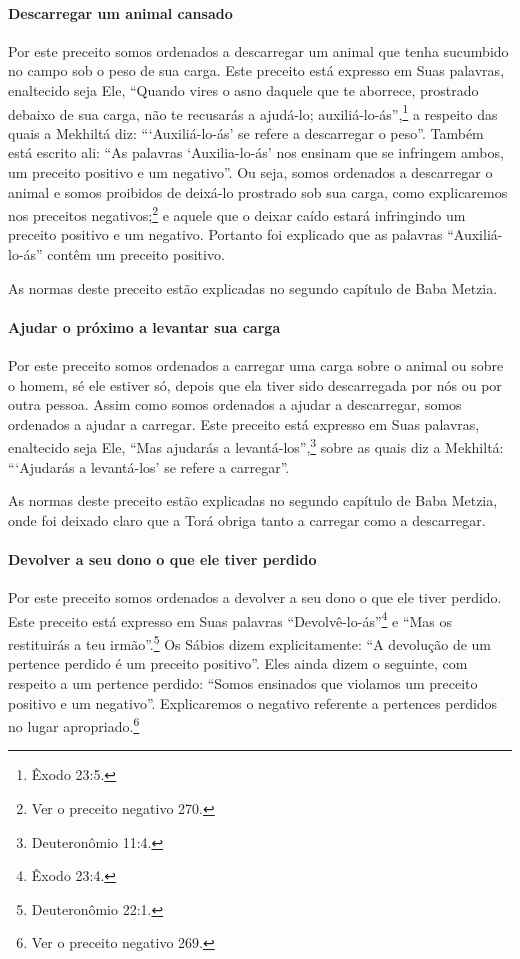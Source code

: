 \paragraph{Descarregar um animal cansado}

Por este preceito somos ordenados a descarregar um animal que tenha
sucumbido no campo sob o peso de sua carga. Este preceito está expresso
em Suas palavras, enaltecido seja Ele, ``Quando vires o asno daquele que
te aborrece, prostrado debaixo de sua carga, não te recusarás a
ajudá-lo; auxiliá-lo-ás'',\footnote{Êxodo 23:5.} a respeito das quais a Mekhiltá
diz: ```Auxiliá-lo-ás' se refere a descarregar o peso''. Também está
escrito ali: ``As palavras `Auxilia-lo-ás' nos ensinam que se infringem
ambos, um preceito positivo e um negativo''. Ou seja, somos ordenados a
descarregar o animal e somos proibidos de deixá-lo prostrado sob sua
carga, como explicaremos nos preceitos negativos;\footnote{Ver o preceito negativo 270.}
e aquele que o deixar caído estará infringindo um preceito positivo e um
negativo. Portanto foi explicado que as palavras ``Auxiliá-lo-ás''
contêm um preceito positivo.

As normas deste preceito estão explicadas no segundo capítulo de Baba Metzia.

\paragraph{Ajudar o próximo a levantar sua carga}

Por este preceito somos ordenados a carregar uma carga sobre o animal
ou sobre o homem, sé ele estiver só, depois que ela tiver sido
descarregada por nós ou por outra pessoa. Assim como somos ordenados a
ajudar a descarregar, somos ordenados a ajudar a carregar. Este
preceito está expresso em Suas palavras, enaltecido seja Ele, ``Mas
ajudarás a levantá-los'',\footnote{Deuteronômio 11:4.} sobre as quais diz a
Mekhiltá: ```Ajudarás a levantá-los' se refere a carregar''.

As normas deste preceito estão explicadas no segundo capítulo de Baba
Metzia, onde foi deixado claro que a Torá obriga tanto a carregar como
a descarregar.

\paragraph{Devolver a seu dono o que ele tiver perdido}

Por este preceito somos ordenados a devolver a seu dono o que ele tiver
perdido. Este preceito está expresso em Suas palavras ``Devolvê-lo-ás''\footnote{Êxodo 23:4.} e ``Mas os restituirás a teu irmão''.\footnote{Deuteronômio 22:1.}
Os Sábios dizem explicitamente: ``A devolução de um pertence perdido é
um preceito positivo''. Eles ainda dizem o seguinte, com respeito a um
pertence perdido: ``Somos ensinados que violamos um preceito positivo e
um negativo''. Explicaremos o negativo referente a pertences perdidos no lugar apropriado.\footnote{Ver o preceito negativo 269.}


